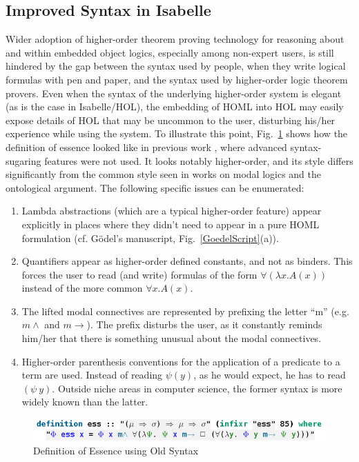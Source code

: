 \documentclass{article}
\newcommand{\imp}{{\rightarrow}}
\begin{document}
\subsection{Improved Syntax in Isabelle}\label{sec:improvedsyntax}

Wider adoption of higher-order theorem proving technology for reasoning about and within embedded object logics, especially among non-expert users, is still hindered by the gap between the syntax used by people, when they write logical formulas with pen and paper, and the syntax used by higher-order logic theorem provers. Even when the syntax of the underlying higher-order system is elegant (as is the case in Isabelle/HOL), the embedding of HOML into HOL may easily expose details of HOL that may be uncommon to the user, disturbing his/her experience while using the system. To illustrate this point, Fig.~\ref{UglyEssence} shows how the definition of essence looked like in previous work \cite{J28}, where advanced syntax-sugaring features were not used. It looks notably higher-order, and its style differs significantly from the common style seen in works on modal logics and the ontological argument. The following specific issues can be enumerated:
\begin{enumerate}
\item Lambda abstractions (which are a typical higher-order feature) appear explicitly in places where they didn't need to appear in a pure HOML formulation (cf. G\"odel's manuscript, Fig.~\ref{GoedelScript}(a)).
\item Quantifiers appear as higher-order defined constants, and not as binders. This forces the user to read (and write) formulas of the form $\forall (\lambda x. A(x))$ instead of the more common $\forall x. A(x)$.
\item The lifted modal connectives are represented by prefixing the
  letter ``m'' (e.g. $m\wedge$ and $m\imp$). The prefix disturbs the
  user, as it constantly reminds him/her that there is something
  unusual about the modal connectives.
\item Higher-order parenthesis conventions for the application of a predicate to a term are used. 
Instead of reading $\psi(y)$, as he would expect, he has to read $(\psi ~ y)$. Outside niche areas in computer science, the former syntax is more widely known than the latter.
\end{enumerate}


\begin{figure}
\centerline{\includegraphics[width=\columnwidth]{./Images/UglyEssence.png}}
\caption{ Definition of Essence using Old Syntax } \label{UglyEssence}
\end{figure}
\end{document}
